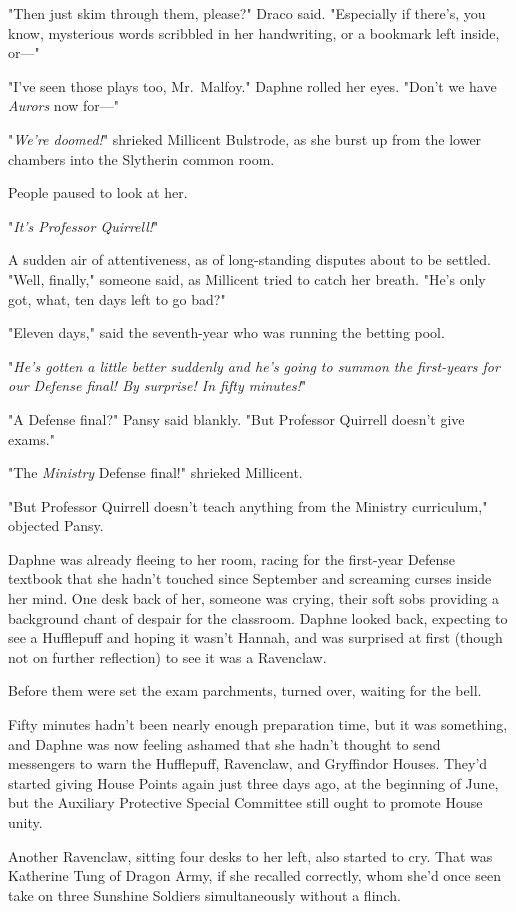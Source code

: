 "Then just skim through them, please?" Draco said. "Especially if there's, you
know, mysterious words scribbled in her handwriting, or a bookmark left inside,
or—"

"I've seen those plays too, Mr.~Malfoy." Daphne rolled her eyes. "Don't we have
\emph{Aurors} now for—"

"\emph{We're doomed!}" shrieked Millicent Bulstrode, as she burst up from the
lower chambers into the Slytherin common room.

People paused to look at her.

"\emph{It's Professor Quirrell!}"

A sudden air of attentiveness, as of long-standing disputes about to be
settled. "Well, finally," someone said, as Millicent tried to catch her breath.
"He's only got, what, ten days left to go bad?"

"Eleven days," said the seventh-year who was running the betting pool.

"\emph{He's gotten a little better suddenly and he's going to summon the
first-years for our Defense final! By surprise! In fifty minutes!}"

"A Defense final?" Pansy said blankly. "But Professor Quirrell doesn't give
exams."

"The \emph{Ministry} Defense final!" shrieked Millicent.

"But Professor Quirrell doesn't teach anything from the Ministry curriculum,"
objected Pansy.

Daphne was already fleeing to her room, racing for the first-year Defense
textbook that she hadn't touched since September and screaming curses inside
her mind.
\sbreak
One desk back of her, someone was crying, their soft sobs providing a
background chant of despair for the classroom. Daphne looked back, expecting to
see a Hufflepuff and hoping it wasn't Hannah, and was surprised at first
(though not on further reflection) to see it was a Ravenclaw.

Before them were set the exam parchments, turned over, waiting for the bell.

Fifty minutes hadn't been nearly enough preparation time, but it was something,
and Daphne was now feeling ashamed that she hadn't thought to send messengers
to warn the Hufflepuff, Ravenclaw, and Gryffindor Houses. They'd started giving
House Points again just three days ago, at the beginning of June, but the
Auxiliary Protective Special Committee still ought to promote House unity.

Another Ravenclaw, sitting four desks to her left, also started to cry. That
was Katherine Tung of Dragon Army, if she recalled correctly, whom she'd once
seen take on three Sunshine Soldiers simultaneously without a flinch.

